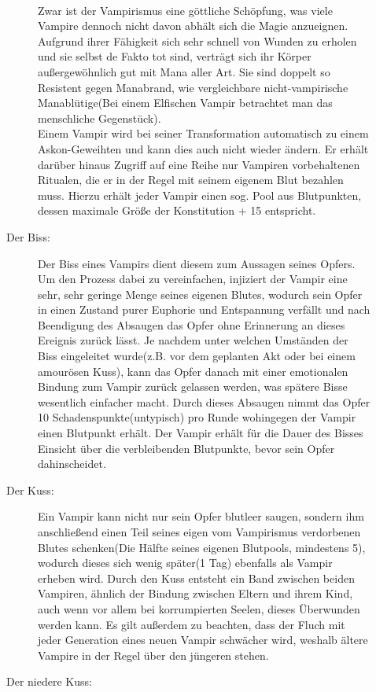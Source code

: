 \documentclass[a4paper,12pt,oneside]{book}
\begin{document}
\begin{description}
\begin{description}
\\Zwar ist der Vampirismus eine göttliche Schöpfung, was viele Vampire dennoch nicht davon abhält sich die Magie anzueignen. Aufgrund ihrer Fähigkeit sich sehr schnell von Wunden zu erholen und sie selbst de Fakto tot sind, verträgt sich ihr Körper außergewöhnlich gut mit Mana aller Art. Sie sind doppelt so Resistent gegen Manabrand, wie vergleichbare nicht-vampirische Manablütige(Bei einem Elfischen Vampir betrachtet man das menschliche Gegenstück).
\\Einem Vampir wird bei seiner Transformation automatisch zu einem Askon-Geweihten und kann dies auch nicht wieder ändern. Er erhält darüber hinaus Zugriff auf eine Reihe nur Vampiren vorbehaltenen Ritualen, die er in der Regel mit seinem eigenem Blut bezahlen muss. Hierzu erhält jeder Vampir einen sog. Pool aus Blutpunkten, dessen maximale Größe der Konstitution + 15 entspricht.
\item[Der Biss:]
Der Biss eines Vampirs dient diesem zum Aussagen seines Opfers. Um den Prozess dabei zu vereinfachen, injiziert der Vampir eine sehr, sehr geringe Menge seines eigenen Blutes, wodurch sein Opfer in einen Zustand purer Euphorie und Entspannung verfällt und nach Beendigung des Absaugen das Opfer ohne Erinnerung an dieses Ereignis zurück lässt. Je nachdem unter welchen Umständen der Biss eingeleitet wurde(z.B. vor dem geplanten Akt oder bei einem amourösen Kuss), kann das Opfer danach mit einer emotionalen Bindung zum Vampir zurück gelassen werden, was spätere Bisse wesentlich einfacher macht. Durch dieses Absaugen nimmt das Opfer 10 Schadenspunkte(untypisch) pro Runde wohingegen der Vampir einen Blutpunkt erhält. Der Vampir erhält für die Dauer des Bisses Einsicht über die verbleibenden Blutpunkte, bevor sein Opfer dahinscheidet.
\item[Der Kuss:]
Ein Vampir kann nicht nur sein Opfer blutleer saugen, sondern ihm anschließend einen Teil seines eigen vom Vampirismus verdorbenen Blutes schenken(Die Hälfte seines eigenen Blutpools, mindestens 5), wodurch dieses sich wenig später(1 Tag) ebenfalls als Vampir erheben wird. Durch den Kuss entsteht ein Band zwischen beiden Vampiren, ähnlich der Bindung zwischen Eltern und ihrem Kind, auch wenn vor allem bei korrumpierten Seelen, dieses Überwunden werden kann. Es gilt außerdem zu beachten, dass der Fluch mit jeder Generation eines neuen Vampir schwächer wird, weshalb ältere Vampire in der Regel über den jüngeren stehen.
\item[Der niedere Kuss:]

\end{description}
\end{description}
\end{document}
